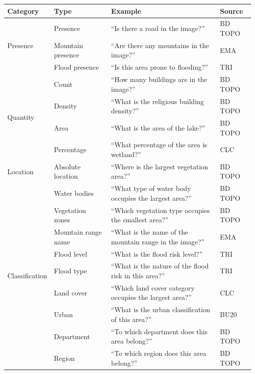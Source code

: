 \begin{table}[ht]
\centering
\small
\begin{tabularx}{\textwidth}{l l >{\raggedright\arraybackslash}X l}
\toprule
\textbf{Category} & \textbf{Type} & \textbf{Example} & \textbf{Source} \\
\midrule
\multirow{3}{*}{Presence}
  & Presence          & ``Is there a road in the image?''            & BD TOPO \\
  & Mountain presence & ``Are there any mountains in the image?''    & EMA \\
  & Flood presence    & ``Is this area prone to flooding?''          & TRI \\
\midrule
\multirow{4}{*}{Quantity}
  & Count       & ``How many buildings are in the image?''                  & BD TOPO \\
  & Density     & ``What is the religious building density?''               & BD TOPO \\
  & Area        & ``What is the area of the lake?''                          & BD TOPO \\
  & Percentage  & ``What percentage of the area is wetland?''                & CLC \\
\midrule
Location
  & Absolute location & ``Where is the largest vegetation area?''       & BD TOPO \\
\midrule
\multirow{9}{*}{Classification}
  & Water bodies        & ``What type of water body occupies the largest area?''  & BD TOPO \\
  & Vegetation zones    & ``Which vegetation type occupies the smallest area?''   & BD TOPO \\
  & Mountain range name & ``What is the name of the mountain range in the image?''& EMA \\
  & Flood level         & ``What is the flood risk level?''                       & TRI \\
  & Flood type          & ``What is the nature of the flood risk in this area?''  & TRI \\
  & Land cover          & ``Which land cover category occupies the largest area?''& CLC \\
  & Urban               & ``What is the urban classification of this area?''      & BU20 \\
  & Department          & ``To which department does this area belong?''         & BD TOPO \\
  & Region              & ``To which region does this area belong?''             & BD TOPO \\

\end{tabularx}
\end{table}
